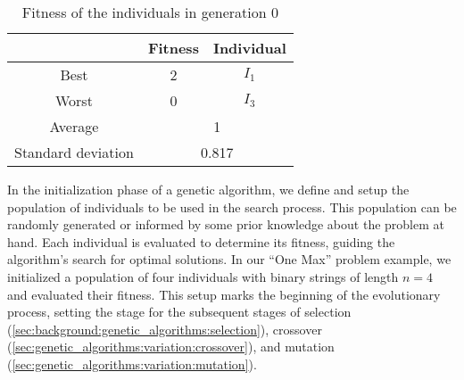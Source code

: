   \begin{table}[H]
    \centering
    \begin{tabular}{|c|c|c|}
      \hline
      & \textbf{Fitness} & \textbf{Individual}  \\
      \hline
      Best & 2 & \(I_1\) \\
      Worst & 0 & \(I_3\) \\
      \hline
      \hline
      Average & \multicolumn{2}{c|}{1} \\
      \hline
      Standard deviation & \multicolumn{2}{c|}{0.817} \\
      \hline
    \end{tabular}
    \caption{Fitness of the individuals in generation 0}
    \label{tab:genetic_algorithms:initialization:population_fitness}
  \end{table}
  
  In the initialization phase of a genetic algorithm, we define and setup the population of 
  individuals to be used in the search process. 
  This population can be randomly generated or informed by some prior knowledge about the problem at 
  hand. 
  Each individual is evaluated to determine its fitness, guiding the algorithm's search for optimal 
  solutions. 
  In our \enquote{One Max} problem example, we initialized a population of four individuals with 
  binary strings of length \(n = 4\) and evaluated their fitness. 
  This setup marks the beginning of the evolutionary process, setting the stage for the subsequent 
  stages of selection (\vref{sec:background:genetic_algorithms:selection}), 
  crossover (\vref{sec:genetic_algorithms:variation:crossover}), and 
  mutation (\vref{sec:genetic_algorithms:variation:mutation}).
